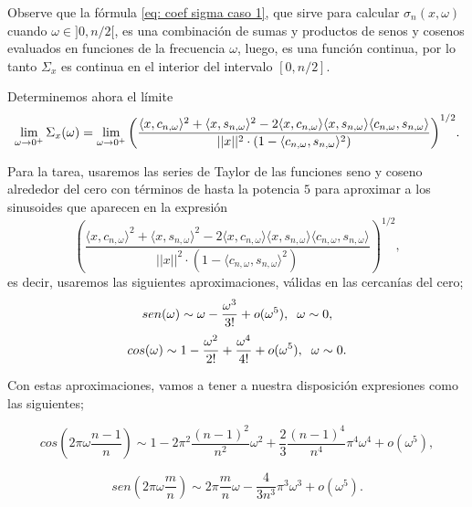 Observe que la fórmula
\eqref{eq: coef sigma caso 1}, que sirve
para calcular $\sigma_{n} (x, \omega)$
cuando $\omega \in ]0, n/2[$, es una combinación
de sumas y productos de senos y cosenos
evaluados en funciones de la frecuencia $\omega$, luego, 
es una función continua, por lo tanto $\Sigma_{x}$
es continua en el interior del intervalo 
$[0, n/2]$.

Determinemos ahora 
el límite
\begin{equation}
\label{eq0: 22May}
\lim\limits_{\omega \rightarrow 0^{+}}{
\Sigma_{x}(\omega)}
= \lim\limits_{\omega \rightarrow 0^{+}}{
\left(		  
		  \frac{\langle x, c_{n, \omega } \rangle^{2} +  \langle x, s_{n, \omega } \rangle^{2}	
	       -2  \langle x, c_{n, \omega } \rangle \langle x, s_{n, \omega } \rangle \langle c_{n, \omega }, s_{n, \omega } \rangle}{ || x ||^{2} \cdot
	       (1- \langle c_{n, \omega }, s_{n, \omega } \rangle^{2})}	  
\right) ^{1/2}
}.
\end{equation}

Para la tarea, usaremos las series de Taylor
de las funciones seno y coseno alrededor del cero
con términos de hasta la potencia $5$ para aproximar
a los sinusoides que aparecen en la expresión 
\begin{equation}
\label{eq1: 22May}
\left(		  
		  \frac{\langle x, c_{n, \omega } \rangle^{2} +  \langle x, s_{n, \omega } \rangle^{2}	
	       -2  \langle x, c_{n, \omega } \rangle \langle x, s_{n, \omega } \rangle \langle c_{n, \omega }, s_{n, \omega } \rangle}{ || x ||^{2} \cdot
	       (1- \langle c_{n, \omega }, s_{n, \omega } \rangle^{2})}	  
\right) ^{1/2},
\end{equation}
es decir, usaremos
las siguientes aproximaciones, válidas en las cercanías
del cero;
\[
sen(\omega) 
\sim
\omega - \frac{\omega^{3}}{3!}
+ o(\omega^{5}),
\hspace{0.2cm} \omega \sim 0,
\]
\[
cos(\omega) \sim 1 - \frac{\omega^{2}}{2!}
+ \frac{\omega^{4}}{4!} + o(\omega^{5}),
\hspace{0.2cm} \omega \sim 0.
\]

Con estas aproximaciones, vamos a tener
a nuestra disposición expresiones como las siguientes;

\[
cos\left(
2 \pi \omega \frac{n-1}{n}\right) \sim
1-2\pi^{2}\frac{(n-1)^{2}}{n^{2}} \omega^{2}
+\frac{2}{3} \frac{(n-1)^{4}}{n^{4}} \pi^{4} \omega^{4}
+ o(\omega^{5}),
\]

\[
sen\left(
2 \pi \omega \frac{m}{n}\right) \sim
2 \pi \frac{m}{n} \omega 
- \frac{4}{3n^{3}}\pi^{3} \omega^{3}
+ o(\omega^{5}).
\]

